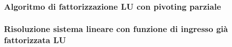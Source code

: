 \subsubsection{Algoritmo di fattorizzazione LU con pivoting parziale}

\subsubsection{Risoluzione sistema lineare con funzione di ingresso già fattorizzata LU}

